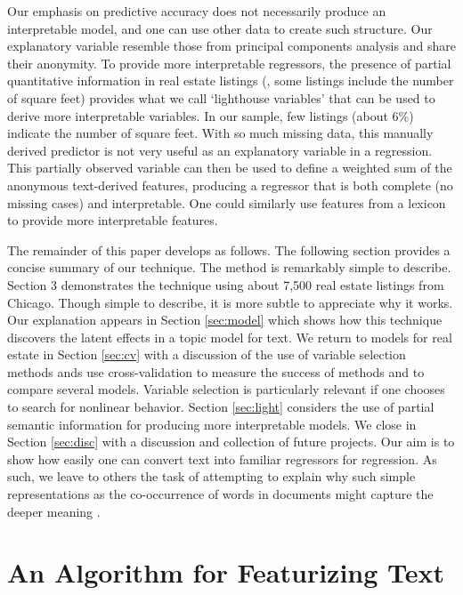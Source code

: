 \documentclass[12pt]{article}
\begin{document}
 Our emphasis on predictive accuracy does not necessarily produce an
 interpretable model, and one can use other data to create such structure.  Our
 explanatory variable resemble those from principal components analysis and
 share their anonymity.  To provide more interpretable regressors, the presence
 of partial quantitative information in real estate listings (\eg, some listings
 include the number of square feet) provides what we call ‘lighthouse variables’
 that can be used to derive more interpretable variables.  In our sample, few
 listings (about 6\%) indicate the number of square feet.  With so much missing
 data, this manually derived predictor is not very useful as an explanatory
 variable in a regression.  This partially observed variable can then be used to
 define a weighted sum of the anonymous text-derived features, producing a
 regressor that is both complete (no missing cases) and interpretable.  One
 could similarly use features from a lexicon to provide more interpretable
 features.


 The remainder of this paper develops as follows.  The following section
 provides a concise summary of our technique.  The method is remarkably simple
 to describe.  Section 3 demonstrates the technique using about 7,500 real
 estate listings from Chicago.  Though simple to describe, it is more subtle to
 appreciate why it works.  Our explanation appears in Section \ref{sec:model} which shows how this technique discovers the latent effects in a topic model for text.  We return to models for real estate in Section \ref{sec:cv} with a discussion of the use of variable selection methods ands use cross-validation to measure the success of methods and to compare several models.  Variable selection is particularly relevant if one chooses to search for nonlinear behavior.  Section \ref{sec:light} considers the use of partial semantic information for producing more interpretable models.  We close in Section \ref{sec:disc} with a discussion and collection of future projects.  Our aim is to show how easily one can convert text into familiar regressors for regression.  As such, we leave to others the task of attempting to explain why such simple representations as the co-occurrence of words in documents might capture the deeper meaning  \citep{deerwester90, landauer97, bullinaria07, turney10}. 


\section{An Algorithm for Featurizing Text}
\label{sec:algo}
\end{document}
